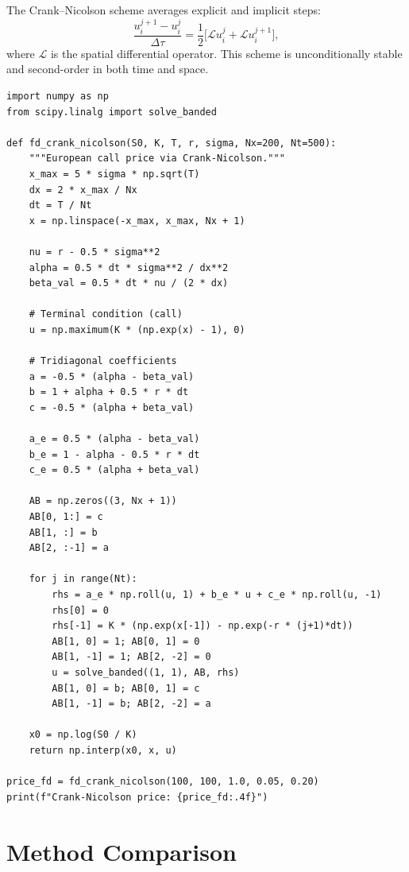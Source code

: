 \begin{definition}
The Crank--Nicolson scheme averages explicit and implicit steps:
\[
    \frac{u_i^{j+1} - u_i^j}{\Delta\tau}
    = \frac{1}{2}\bigl[\mathcal{L}u_i^j + \mathcal{L}u_i^{j+1}\bigr],
\]
where $\mathcal{L}$ is the spatial differential operator. This scheme is
unconditionally stable and second-order in both time and space.
\end{definition}

\begin{codeblock}[title=\textbf{Finite Differences --- Crank--Nicolson}]
\begin{verbatim}
import numpy as np
from scipy.linalg import solve_banded

def fd_crank_nicolson(S0, K, T, r, sigma, Nx=200, Nt=500):
    """European call price via Crank-Nicolson."""
    x_max = 5 * sigma * np.sqrt(T)
    dx = 2 * x_max / Nx
    dt = T / Nt
    x = np.linspace(-x_max, x_max, Nx + 1)

    nu = r - 0.5 * sigma**2
    alpha = 0.5 * dt * sigma**2 / dx**2
    beta_val = 0.5 * dt * nu / (2 * dx)

    # Terminal condition (call)
    u = np.maximum(K * (np.exp(x) - 1), 0)

    # Tridiagonal coefficients
    a = -0.5 * (alpha - beta_val)
    b = 1 + alpha + 0.5 * r * dt
    c = -0.5 * (alpha + beta_val)

    a_e = 0.5 * (alpha - beta_val)
    b_e = 1 - alpha - 0.5 * r * dt
    c_e = 0.5 * (alpha + beta_val)

    AB = np.zeros((3, Nx + 1))
    AB[0, 1:] = c
    AB[1, :] = b
    AB[2, :-1] = a

    for j in range(Nt):
        rhs = a_e * np.roll(u, 1) + b_e * u + c_e * np.roll(u, -1)
        rhs[0] = 0
        rhs[-1] = K * (np.exp(x[-1]) - np.exp(-r * (j+1)*dt))
        AB[1, 0] = 1; AB[0, 1] = 0
        AB[1, -1] = 1; AB[2, -2] = 0
        u = solve_banded((1, 1), AB, rhs)
        AB[1, 0] = b; AB[0, 1] = c
        AB[1, -1] = b; AB[2, -2] = a

    x0 = np.log(S0 / K)
    return np.interp(x0, x, u)

price_fd = fd_crank_nicolson(100, 100, 1.0, 0.05, 0.20)
print(f"Crank-Nicolson price: {price_fd:.4f}")
\end{verbatim}
\end{codeblock}

\section{Method Comparison}

